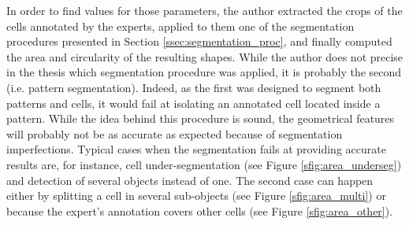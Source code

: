 In order to find values for those parameters, the author extracted the crops of the cells annotated by the experts, applied to them one of the segmentation procedures presented in Section \ref{ssec:segmentation_proc}, and finally computed the area and circularity of the resulting shapes. While the author does not precise in the thesis which segmentation procedure was applied, it is probably the second (i.e. pattern segmentation). Indeed, as the first was designed to segment both patterns and cells, it would fail at isolating an annotated cell located inside a pattern. While the idea behind this procedure is sound, the geometrical features will probably not be as accurate as expected because of segmentation imperfections. Typical cases when the segmentation fails at providing accurate results are, for instance, cell under-segmentation (see Figure \ref{sfig:area_underseg}) and detection of several objects instead of one. The second case can happen either by splitting a cell in several sub-objects (see Figure \ref{sfig:area_multi}) or because the expert's annotation covers other cells (see Figure \ref{sfig:area_other}). 

